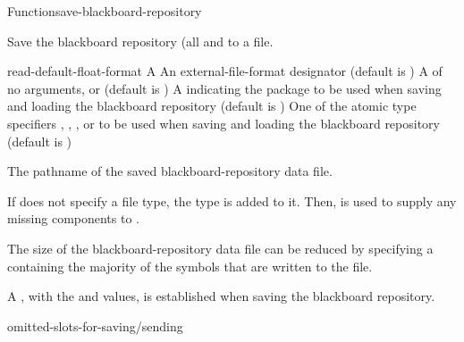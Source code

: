 \documentclass[10pt,twoside,english,pdftex]{article}
\begin{document}

\begin{functiondoc}{Function}{save-blackboard-repository}%
  {
      
    \returns{} }
%
% 

\fnsyntax 

\fnpurpose Save the blackboard repository (all  and
 to a file.

\fnpackage {}

\fnmodule {}

\fnargs
\begin{args}{read-default-float-format}
\arg[pathname] A 
 An external-file-format designator (default is
  )
 A  of no arguments, or
  \nil{} (default is \nil)
\arg[package] A  indicating the package to be used
when saving and loading the blackboard repository (default is
)
 One of the atomic type specifiers
, , , or
 to be used when saving and loading the blackboard repository
(default is )
\end{args}

\fnreturns The pathname of the saved blackboard-repository data file.

\fndescription If  does not specify a file type, the type
 is added to it.  Then,  is used to
supply any missing components to .

The size of the blackboard-repository data file can be reduced by specifying a
 containing the majority of the symbols that are written to the
file.

A \textbf{}, with the
 and  values, is
established when saving the blackboard repository.

\begin{alsos}{omitted-slots-for-saving/sending}
\end{alsos}


\end{functiondoc}
\end{document}
